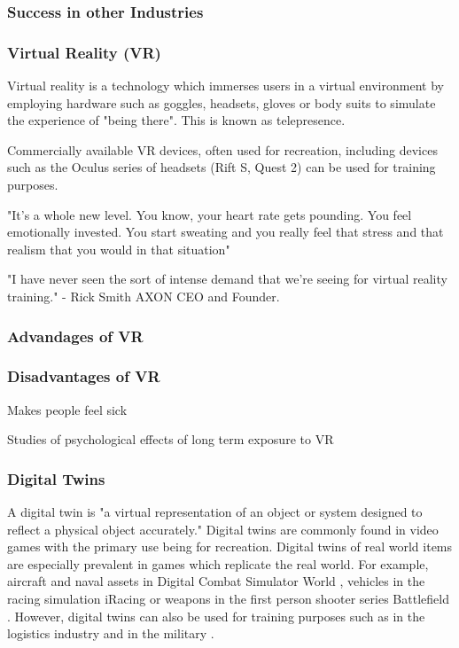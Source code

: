 \documentclass[12pt]{article}
\begin{document}
\subsubsection{Success in other Industries}

\subsubsection{Virtual Reality (VR)}

Virtual reality is a technology which immerses users in a virtual environment by employing hardware such as goggles, headsets, gloves or body suits to simulate the experience of "being there". This is known as telepresence. \cite{britannicaVR}

Commercially available VR devices, often used for recreation, including devices such as the Oculus series of headsets (Rift S, Quest 2) \cite{greenwald2020} can be used for training purposes. \cite{kaplan2021effects}\cite{axonVRTraining}\cite{axonVRTrainingUK}

"It's a whole new level. You know, your heart rate gets pounding. You feel emotionally invested. You start sweating and you really feel that stress and that realism that you would in that situation"

"I have never seen the sort of intense demand that we're seeing for virtual reality training." - Rick Smith AXON CEO and Founder. \cite{axonYouTube}

\subsubsection{Advandages of VR}

\subsubsection{Disadvantages of VR}

Makes people feel sick

Studies of psychological effects of long term exposure to VR

\subsubsection{Digital Twins}

A digital twin is "a virtual representation of an object or system designed to reflect a physical object accurately." \cite{ibmDigitalTwin} Digital twins are commonly found in video games with the primary use being for recreation. Digital twins of real world items are especially prevalent in games which replicate the real world. For example, aircraft and naval assets in Digital Combat Simulator World \cite{dcsworld}, vehicles in the racing simulation iRacing \cite{iracing} or weapons in the first person shooter series Battlefield \cite{battlefield4}. However, digital twins can also be used for training purposes such as in the logistics industry \cite{longo2023prepare} and in the military \cite{ukcatt}.
\end{document}
